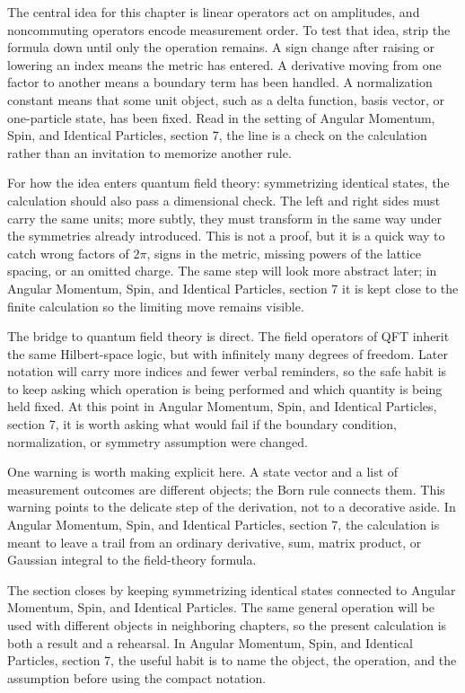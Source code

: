 The central idea for this chapter is linear operators act on amplitudes, and noncommuting operators encode measurement order.  To test that idea, strip the formula down until only the operation remains.  A sign change after raising or lowering an index means the metric has entered.  A derivative moving from one factor to another means a boundary term has been handled.  A normalization constant means that some unit object, such as a delta function, basis vector, or one-particle state, has been fixed.  Read in the setting of Angular Momentum, Spin, and Identical Particles, section 7, the line is a check on the calculation rather than an invitation to memorize another rule.

For how the idea enters quantum field theory: symmetrizing identical states, the calculation should also pass a dimensional check.  The left and right sides must carry the same units; more subtly, they must transform in the same way under the symmetries already introduced.  This is not a proof, but it is a quick way to catch wrong factors of \(2\pi\), signs in the metric, missing powers of the lattice spacing, or an omitted charge.  The same step will look more abstract later; in Angular Momentum, Spin, and Identical Particles, section 7 it is kept close to the finite calculation so the limiting move remains visible.

The bridge to quantum field theory is direct.  The field operators of QFT inherit the same Hilbert-space logic, but with infinitely many degrees of freedom.  Later notation will carry more indices and fewer verbal reminders, so the safe habit is to keep asking which operation is being performed and which quantity is being held fixed.  At this point in Angular Momentum, Spin, and Identical Particles, section 7, it is worth asking what would fail if the boundary condition, normalization, or symmetry assumption were changed.

One warning is worth making explicit here.  A state vector and a list of measurement outcomes are different objects; the Born rule connects them.  This warning points to the delicate step of the derivation, not to a decorative aside.  In Angular Momentum, Spin, and Identical Particles, section 7, the calculation is meant to leave a trail from an ordinary derivative, sum, matrix product, or Gaussian integral to the field-theory formula.

The section closes by keeping symmetrizing identical states connected to Angular Momentum, Spin, and Identical Particles.  The same general operation will be used with different objects in neighboring chapters, so the present calculation is both a result and a rehearsal.  In Angular Momentum, Spin, and Identical Particles, section 7, the useful habit is to name the object, the operation, and the assumption before using the compact notation.



